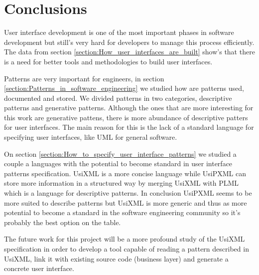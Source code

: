 \section{Conclusions}
User interface development is one of the most important phases in software development but still's very hard for developers to manage this process efficiently. The data from section \ref{section:How_user_interfaces_are_built} show's that there is a need for better tools and methodologies to build user interfaces.

Patterns are very important for engineers, in section \ref{section:Patterns_in_software_engineering} we studied how are patterns used, documented and stored. We divided patterns in two categories, descriptive patterns and generative patterns. Although the ones that are more interesting for this work are generative pattens, there is more abundance of descriptive patters for user interfaces. The main reason for this is the lack of a standard language for specifying user interfaces, like UML for general software.

On section \ref{section:How_to_specify_user_interface_patterns} we studied a couple a languages with the potential to become standard in user interface patterns specification. UsiXML is a more concise language while UsiPXML can store more information in a structured way by merging UsiXML with PLML which is a language for descriptive patterns. In conclusion UsiPXML seems to be more suited to describe patterns but UsiXML is more generic and thus as more potential to become a standard in the software engineering community so it's probably the best option on the table.

The future work for this project will be a more profound study of the UsiXML specification in order to develop a tool capable of reading a pattern described in UsiXML, link it with existing source code (business layer) and generate a concrete user interface.